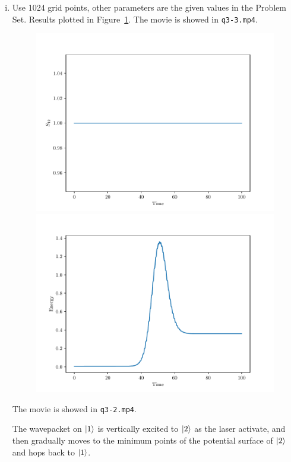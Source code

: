 \documentclass{article}
\begin{document}
\begin{enumerate}[1.]
\begin{enumerate}[(i)]
    \item Use 1024 grid points, other parameters are the given values in the Problem Set.
    Results plotted in Figure~\ref{fig:3-3}.
    The movie is showed in \texttt{q3-3.mp4}.

    \begin{figure}[H]
      \centering
      \begin{minipage}{0.48\linewidth}
        \centering
        \includegraphics[width=\linewidth]{q3-3_time_s12.pdf}
      \end{minipage}
      \begin{minipage}{0.48\linewidth}
        \centering
        \includegraphics[width=\linewidth]{q3-3_time_energy.pdf}
      \end{minipage}
      \caption{}
      \label{fig:3-3}
    \end{figure}
    The movie is showed in \texttt{q3-2.mp4}.

    The wavepacket on $\ket{1}$ is vertically excited to $\ket{2}$ as the laser activate, and then gradually moves to the minimum points of the potential surface of $\ket{2}$ and hops back to $\ket{1}$.
  \end{enumerate}
\end{enumerate}
\end{document}
